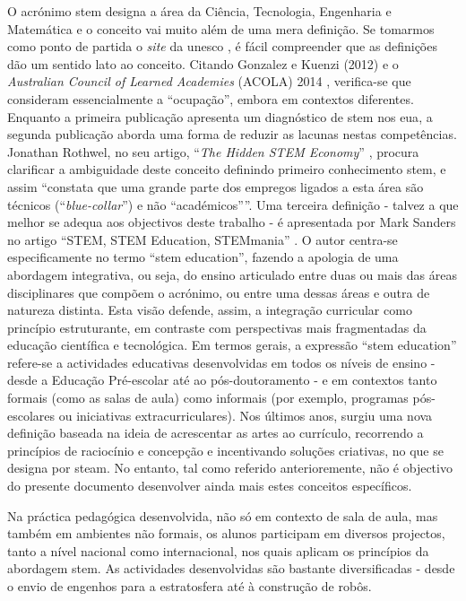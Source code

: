 O acrónimo \acrshort{stem} designa a área da Ciência, Tecnologia, Engenharia e Matemática e o conceito vai muito além de uma mera definição. Se tomarmos como ponto de partida o \textit{site} da \acrshort{unesco} \cite{GlossaryUNESCO}, é fácil compreender que as definições dão um sentido lato ao conceito. Citando Gonzalez e Kuenzi (2012) \cite{GonzalezKuenzi} e o \textit{Australian Council of Learned Academies} (ACOLA) 2014 \cite{acola}, verifica-se que consideram essencialmente a ``ocupação'', embora em contextos diferentes. Enquanto a primeira publicação apresenta um diagnóstico de \acrshort{stem} nos \acrfull{eua}, a segunda publicação aborda uma forma de reduzir as lacunas nestas competências. Jonathan Rothwel, no seu artigo, ``\textit{The Hidden STEM Economy}'' \cite{TheHidde2:online}, procura clarificar a ambiguidade deste conceito definindo primeiro conhecimento \acrshort{stem}, e assim ``constata que uma grande parte dos empregos ligados a esta área são técnicos (``\textit{blue-collar}'') e não ``académicos''''. Uma terceira definição - talvez a que melhor se adequa aos objectivos deste trabalho - é apresentada por Mark Sanders no artigo “STEM, STEM Education, STEMmania” \cite{TTTSTEMA77:online}. O autor centra-se especificamente no termo ``\acrshort{stem} education'', fazendo a apologia de uma abordagem integrativa, ou seja, do ensino articulado entre duas ou mais das áreas disciplinares que compõem o acrónimo, ou entre uma dessas áreas e outra de natureza distinta. Esta visão defende, assim, a integração curricular como princípio estruturante, em contraste com perspectivas mais fragmentadas da educação científica e tecnológica.
Em termos gerais, a expressão ``\acrshort{stem} education'' refere-se a actividades educativas desenvolvidas em todos os níveis de ensino - desde a Educação Pré-escolar até ao pós-doutoramento - e em contextos tanto formais (como as salas de aula) como informais (por exemplo, programas pós-escolares ou iniciativas extracurriculares). Nos últimos anos, surgiu uma nova definição baseada na ideia de acrescentar as artes ao currículo, recorrendo a princípios de raciocínio e concepção e incentivando soluções criativas, no que se designa por \acrfull{steam}. No entanto, tal como referido anterioremente, não é objectivo do presente documento desenvolver ainda mais estes conceitos específicos.

Na práctica pedagógica desenvolvida, não só em contexto de sala de aula, mas também em ambientes não formais, os alunos participam em diversos projectos, tanto a nível nacional como internacional, nos quais aplicam os princípios da abordagem \acrshort{stem}. As actividades desenvolvidas são bastante diversificadas - desde o envio de engenhos para a estratosfera até à construção de robôs.

